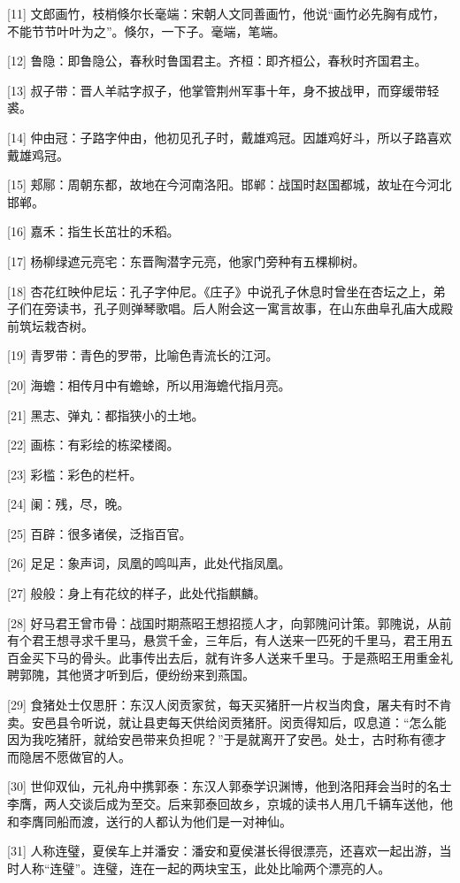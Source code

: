 \documentclass[12pt,UTF8]{ctexbook}
\begin{document}
[11] 文郎画竹，枝梢倏尔长毫端：宋朝人文同善画竹，他说“画竹必先胸有成竹，不能节节叶叶为之”。倏尔，一下子。毫端，笔端。

[12] 鲁隐：即鲁隐公，春秋时鲁国君主。齐桓：即齐桓公，春秋时齐国君主。

[13] 叔子带：晋人羊祜字叔子，他掌管荆州军事十年，身不披战甲，而穿缓带轻裘。

[14] 仲由冠：子路字仲由，他初见孔子时，戴雄鸡冠。因雄鸡好斗，所以子路喜欢戴雄鸡冠。

[15] 郏鄏：周朝东都，故地在今河南洛阳。邯郸：战国时赵国都城，故址在今河北邯郸。

[16] 嘉禾：指生长茁壮的禾稻。

[17] 杨柳绿遮元亮宅：东晋陶潜字元亮，他家门旁种有五棵柳树。

[18] 杏花红映仲尼坛：孔子字仲尼。《庄子》中说孔子休息时曾坐在杏坛之上，弟子们在旁读书，孔子则弹琴歌唱。后人附会这一寓言故事，在山东曲阜孔庙大成殿前筑坛栽杏树。

[19] 青罗带：青色的罗带，比喻色青流长的江河。

[20] 海蟾：相传月中有蟾蜍，所以用海蟾代指月亮。

[21] 黑志、弹丸：都指狭小的土地。

[22] 画栋：有彩绘的栋梁楼阁。

[23] 彩槛：彩色的栏杆。

[24] 阑：残，尽，晚。

[25] 百辟：很多诸侯，泛指百官。

[26] 足足：象声词，凤凰的鸣叫声，此处代指凤凰。

[27] 般般：身上有花纹的样子，此处代指麒麟。

[28] 好马君王曾市骨：战国时期燕昭王想招揽人才，向郭隗问计策。郭隗说，从前有个君王想寻求千里马，悬赏千金，三年后，有人送来一匹死的千里马，君王用五百金买下马的骨头。此事传出去后，就有许多人送来千里马。于是燕昭王用重金礼聘郭隗，其他贤才听到后，便纷纷来到燕国。

[29] 食猪处士仅思肝：东汉人闵贡家贫，每天买猪肝一片权当肉食，屠夫有时不肯卖。安邑县令听说，就让县吏每天供给闵贡猪肝。闵贡得知后，叹息道：“怎么能因为我吃猪肝，就给安邑带来负担呢？”于是就离开了安邑。处士，古时称有德才而隐居不愿做官的人。

[30] 世仰双仙，元礼舟中携郭泰：东汉人郭泰学识渊博，他到洛阳拜会当时的名士李膺，两人交谈后成为至交。后来郭泰回故乡，京城的读书人用几千辆车送他，他和李膺同船而渡，送行的人都认为他们是一对神仙。

[31] 人称连璧，夏侯车上并潘安：潘安和夏侯湛长得很漂亮，还喜欢一起出游，当时人称“连璧”。连璧，连在一起的两块宝玉，此处比喻两个漂亮的人。
\end{document}
